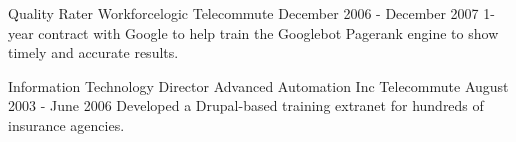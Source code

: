 \begin{cventries}

\cventry
{Quality Rater}
{Workforcelogic}
{Telecommute}
{December 2006 - December 2007} %
{ %
1-year contract with Google to help train the Googlebot Pagerank engine to show timely and accurate results.
}


\cventry
{Information Technology Director}
{Advanced Automation Inc}
{Telecommute}
{August 2003 - June 2006} %
{ %
Developed a Drupal-based training extranet for hundreds of insurance agencies.
}


\end{cventries}
